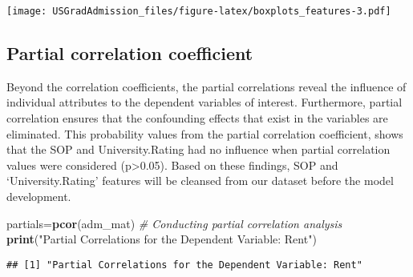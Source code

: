 \documentclass[11pt,]{article}
\newenvironment{Shaded}{\begin{snugshade}}{\end{snugshade}}
\newcommand{\CommentTok}[1]{\textcolor[rgb]{0.56,0.35,0.01}{\textit{#1}}}
\newcommand{\DataTypeTok}[1]{\textcolor[rgb]{0.13,0.29,0.53}{#1}}
\newcommand{\DecValTok}[1]{\textcolor[rgb]{0.00,0.00,0.81}{#1}}
\newcommand{\KeywordTok}[1]{\textcolor[rgb]{0.13,0.29,0.53}{\textbf{#1}}}
\newcommand{\NormalTok}[1]{#1}
\newcommand{\OperatorTok}[1]{\textcolor[rgb]{0.81,0.36,0.00}{\textbf{#1}}}
\newcommand{\StringTok}[1]{\textcolor[rgb]{0.31,0.60,0.02}{#1}}
\begin{document}
\texttt{[image: USGradAdmission\_files/figure-latex/boxplots\_features-3.pdf]}

\hypertarget{partial-correlation-coefficient}{%
\subsection{Partial correlation
coefficient}\label{partial-correlation-coefficient}}

Beyond the correlation coefficients, the partial correlations reveal the
influence of individual attributes to the dependent variables of
interest. Furthermore, partial correlation ensures that the confounding
effects that exist in the variables are eliminated. This probability
values from the partial correlation coefficient, shows that the SOP and
University.Rating had no influence when partial correlation values were
considered (p\textgreater{}0.05). Based on these findings, SOP and
`University.Rating' features will be cleansed from our dataset before
the model development.

\begin{Shaded}
\begin{Highlighting}[]
\NormalTok{partials=}\KeywordTok{pcor}\NormalTok{(adm_mat) }\CommentTok{# Conducting partial correlation analysis}
\KeywordTok{print}\NormalTok{(}\StringTok{"Partial Correlations for the Dependent Variable: Rent"}\NormalTok{)}
\end{Highlighting}
\end{Shaded}

\begin{verbatim}
## [1] "Partial Correlations for the Dependent Variable: Rent"
\end{verbatim}

\begin{Shaded}
\end{Shaded}
\end{document}
